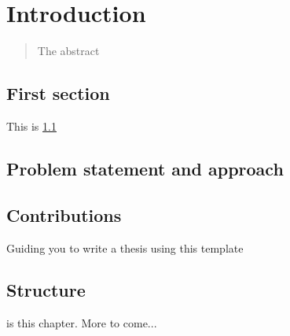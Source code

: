 \chapter{Introduction}
\label{c:introduction}

\begin{abstract}%
    The abstract
\end{abstract}

\section{First section}
\label{s:intro:first}

This is \cref{s:intro:first}


\section{Problem statement and approach}
\label{s:intro:problem}

\chapdef{}%
\begin{emphasize}
	\theproblem
\end{emphasize}

\section{Contributions}
Guiding you to write a thesis using this template

\section{Structure}

 is this chapter. More to come...
